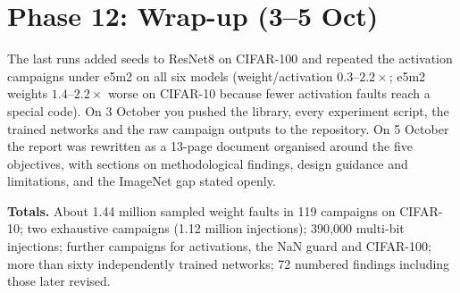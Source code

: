 \section{Phase 12: Wrap-up (3--5 Oct)}
The last runs added seeds to ResNet8 on CIFAR-100 and repeated the activation campaigns under e5m2 on all six models (weight/activation $0.3$--$2.2\times$; e5m2 weights $1.4$--$2.2\times$ worse on CIFAR-10 because fewer activation faults reach a special code). On 3 October you pushed the library, every experiment script, the trained networks and the raw campaign outputs to the repository.
On 5 October the report was rewritten as a 13-page document organised around the five objectives, with sections on methodological findings, design guidance and limitations, and the ImageNet gap stated openly.

\textbf{Totals.} About 1.44 million sampled weight faults in 119 campaigns on CIFAR-10; two exhaustive campaigns (1.12 million injections); 390{,}000 multi-bit injections; further campaigns for activations, the NaN guard and CIFAR-100; more than sixty independently trained networks; 72 numbered findings including those later revised.
